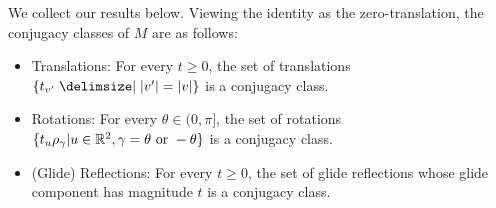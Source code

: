 \documentclass{scrartcl}
\newcommand{\cbold}[1]{{#1}}
\begin{document}
\begin{solution}
    We collect our results below. Viewing the identity as the zero-translation, the conjugacy classes of $M$ are as follows:
    \begin{itemize}
        \item \cbold{Translations:} For every $t\ge 0$, the set of translations $\{t_{v'}\mid \abs{v'}=\abs{v}\}$ is a conjugacy class.
        \item \cbold{Rotations:} For every $\theta\in (0,\pi]$, the set of rotations $\{t_u\rho_\gamma| u\in \mathbb R^2, \gamma=\theta \text{ or } -\theta\}$ is a conjugacy class.
        \item \cbold{(Glide) Reflections:} For every $t\ge 0$, the set of glide reflections whose glide component has magnitude $t$ is a conjugacy class.
    \end{itemize}
    \end{solution}
        
\end{document}
